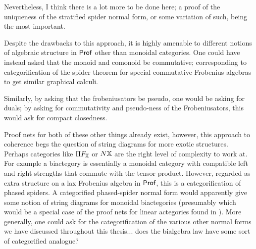 Nevertheless, I think there is a lot more to be done here; a proof of the uniqueness of the stratified spider normal form, or some variation of such,  being the most important. 


Despite the drawbacks to this approach, it is highly amenable to different notions of algebraic structure in ${\sf Prof}$ other than monoidal categories. One could have instead asked that the monoid and comonoid be commutative; corresponding to categorification of the spider theorem for special commutative Frobenius algebras to get similar graphical calculi.

Similarly, by asking that the frobeniusators be pseudo, one would be asking for duals; by asking for commutativity and pseudo-ness of the Frobeniusators, this would ask for compact closedness.



Proof nets for both of these other things already exist, however, this approach to coherence begs the question of string diagrams for more exotic structures.
Perhaps categories like $\Pi F_{\mathbb{X}}$ or $N\mathbb{X}$ are the right level of complexity to work at.
  For example a biactegory is essentially a monoidal category with compatible left and right strengths that commute with the tensor product. However, regarded as extra structure on a lax Frobenius algebra in ${\sf Prof}$, this is a categorification of phased spiders. A categorified phased-spider normal form would apparently give some notion of string diagrams for monoidal biactegories (presumably which would be a special case of the proof nets for linear actegories found in \cite[\S6.1]{polyact}).  More generally, one could ask for the categorification of the various other normal forms we have discussed throughout this thesis... does the bialgebra law have some sort of categorified analogue?






















